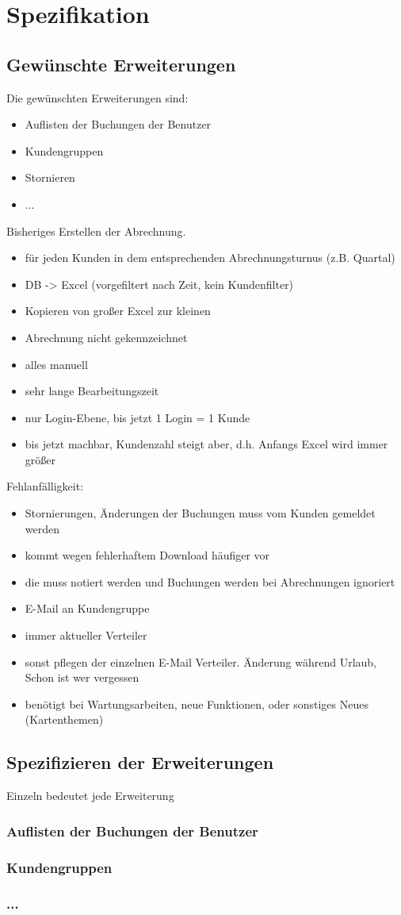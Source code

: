 \chapter{Spezifikation}
\section{Gewünschte Erweiterungen}
Die gewünschten Erweiterungen sind:
\begin{itemize}
	\item Auflisten der Buchungen der Benutzer
	\item Kundengruppen
	\item Stornieren
	\item ...
\end{itemize}

Bisheriges Erstellen der Abrechnung.
\begin{itemize}
\item für jeden Kunden in dem entsprechenden Abrechnungsturnus (z.B. Quartal)
\item DB -> Excel (vorgefiltert nach Zeit, kein Kundenfilter)
\item Kopieren von großer Excel zur kleinen
\item Abrechnung nicht gekennzeichnet
\item alles manuell
\item sehr lange Bearbeitungszeit
\item nur Login-Ebene, bis jetzt 1 Login = 1 Kunde
\item bis jetzt machbar, Kundenzahl steigt aber, d.h. Anfangs Excel wird immer größer
\end{itemize}

Fehlanfälligkeit:
\begin{itemize}
\item Stornierungen, Änderungen der Buchungen muss vom Kunden gemeldet werden
\item kommt wegen fehlerhaftem Download häufiger vor
\item die muss notiert werden und Buchungen werden bei Abrechnungen ignoriert
\end{itemize}

\begin{itemize}
\item E-Mail an Kundengruppe
\item immer aktueller Verteiler
\item sonst pflegen der einzelnen E-Mail Verteiler. Änderung während Urlaub, Schon ist wer vergessen
\item benötigt bei Wartungsarbeiten, neue Funktionen, oder sonstiges Neues (Kartenthemen)
\end{itemize}

\section{Spezifizieren der Erweiterungen}
Einzeln bedeutet jede Erweiterung
\subsection{Auflisten der Buchungen der Benutzer}
\subsection{Kundengruppen}
\subsection{...}


